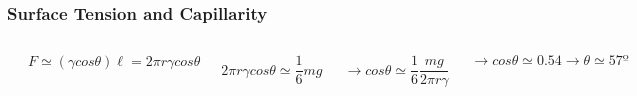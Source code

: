 \documentclass[]{beamer}
\begin{document}
\begin{frame}

\frametitle{Surface Tension and Capillarity}


   \begin{columns}[c]
   \column{2in}  %

      \begin{center}
  \includegraphics[height=1.5in]{images2/mosquito2.jpg}
\end{center}

   \column{2in}

\begin{equation*}
F\simeq(\gamma cos\theta) \ell=2\pi r \gamma cos\theta
\end{equation*}

\pause

\begin{equation*}
2\pi r \gamma cos\theta\simeq\frac{1}{6} mg
\end{equation*}

\pause

\begin{equation*}
\rightarrow cos \theta \simeq \frac{1}{6} \frac{mg}{2\pi r \gamma}
\end{equation*}

\pause

\begin{equation*}
\rightarrow cos \theta \simeq 0.54 \rightarrow \theta\simeq 57º
\end{equation*}

   \end{columns}




 \end{frame}


\end{document}
